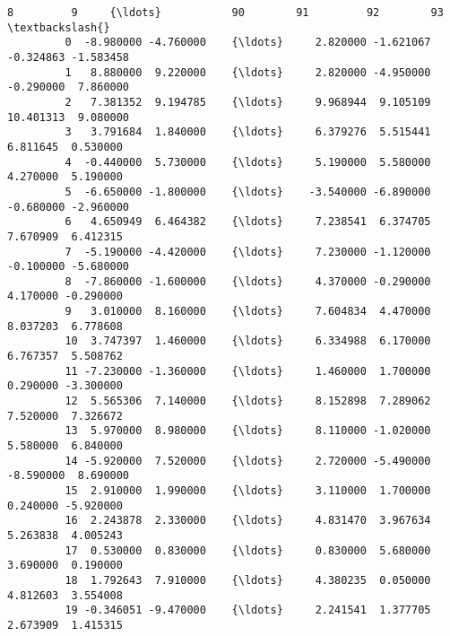 \documentclass[11pt]{article}
\begin{document}
\begin{Verbatim}[commandchars=\\\{\}]
                   8         9     {\ldots}           90        91         92        93  \textbackslash{}
         0  -8.980000 -4.760000    {\ldots}     2.820000 -1.621067  -0.324863 -1.583458   
         1   8.880000  9.220000    {\ldots}     2.820000 -4.950000  -0.290000  7.860000   
         2   7.381352  9.194785    {\ldots}     9.968944  9.105109  10.401313  9.080000   
         3   3.791684  1.840000    {\ldots}     6.379276  5.515441   6.811645  0.530000   
         4  -0.440000  5.730000    {\ldots}     5.190000  5.580000   4.270000  5.190000   
         5  -6.650000 -1.800000    {\ldots}    -3.540000 -6.890000  -0.680000 -2.960000   
         6   4.650949  6.464382    {\ldots}     7.238541  6.374705   7.670909  6.412315   
         7  -5.190000 -4.420000    {\ldots}     7.230000 -1.120000  -0.100000 -5.680000   
         8  -7.860000 -1.600000    {\ldots}     4.370000 -0.290000   4.170000 -0.290000   
         9   3.010000  8.160000    {\ldots}     7.604834  4.470000   8.037203  6.778608   
         10  3.747397  1.460000    {\ldots}     6.334988  6.170000   6.767357  5.508762   
         11 -7.230000 -1.360000    {\ldots}     1.460000  1.700000   0.290000 -3.300000   
         12  5.565306  7.140000    {\ldots}     8.152898  7.289062   7.520000  7.326672   
         13  5.970000  8.980000    {\ldots}     8.110000 -1.020000   5.580000  6.840000   
         14 -5.920000  7.520000    {\ldots}     2.720000 -5.490000  -8.590000  8.690000   
         15  2.910000  1.990000    {\ldots}     3.110000  1.700000   0.240000 -5.920000   
         16  2.243878  2.330000    {\ldots}     4.831470  3.967634   5.263838  4.005243   
         17  0.530000  0.830000    {\ldots}     0.830000  5.680000   3.690000  0.190000   
         18  1.792643  7.910000    {\ldots}     4.380235  0.050000   4.812603  3.554008   
         19 -0.346051 -9.470000    {\ldots}     2.241541  1.377705   2.673909  1.415315   
         

\end{Verbatim}
\end{document}
